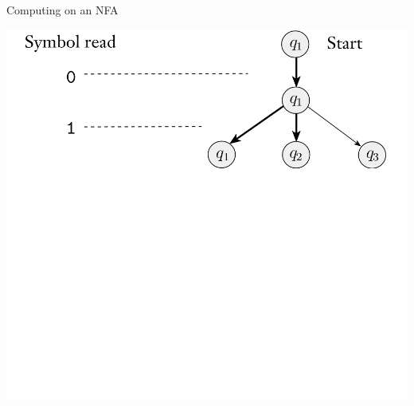 \documentclass[aspectratio=169]{beamer}
\begin{document}
\begin{frame}{Computing on an NFA}
    \begin{center}
        \includegraphics[scale=0.80]{N1_compute/N1_2.png}
    \end{center}
\end{frame}
\end{document}

